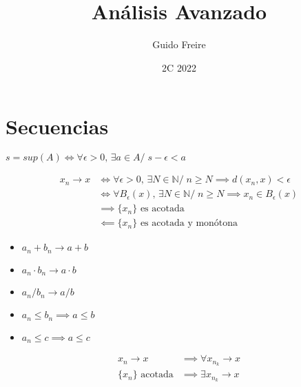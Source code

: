 \documentclass{article}
\title{An\'alisis Avanzado}
\author{Guido Freire}
\date{2C 2022}
\begin{document}
\maketitle

\section{Secuencias}
\begin{definicion}[Supremo]
    $s = sup(A) \iff \forall \epsilon > 0,\, \exists a \in A /\; s - \epsilon < a$
\end{definicion}
\begin{definicion}[Convergencia]
    \begin{align*}
        x_n \rightarrow x &\iff \forall \epsilon > 0,\, \exists N \in \mathbb{N} /\; n \geq N \implies d(x_n, x) < \epsilon\\
            &\iff \forall B_\epsilon(x),\, \exists N \in \mathbb{N} /\; n \geq N \implies x_n \in B_\epsilon(x)\\
            &\implies \{x_n\} \text{ es acotada}\\
            & \impliedby \{x_n\} \text{ es acotada y mon\'otona}
    \end{align*}
\end{definicion}
\begin{teorema}
    \begin{itemize}
    \item $a_n + b_n \rightarrow a + b$
    \item $a_n\cdot b_n \rightarrow a\cdot b$
    \item $a_n / b_n \rightarrow a/b$
    \end{itemize}
\end{teorema}
\begin{teorema}
    \begin{itemize}
        \item $a_n \leq b_n \implies a \leq b$
        \item $a_n \leq c \implies a \leq c$
        \end{itemize}
\end{teorema}
\begin{teorema}[Subsecuencias]
    \begin{align*}
        x_n \rightarrow x &\implies \forall x_{n_k} \rightarrow x\\
        \{x_n\} \text{ acotada} &\implies \exists x_{n_k} \rightarrow x
    \end{align*}
\end{teorema}
\end{document}

